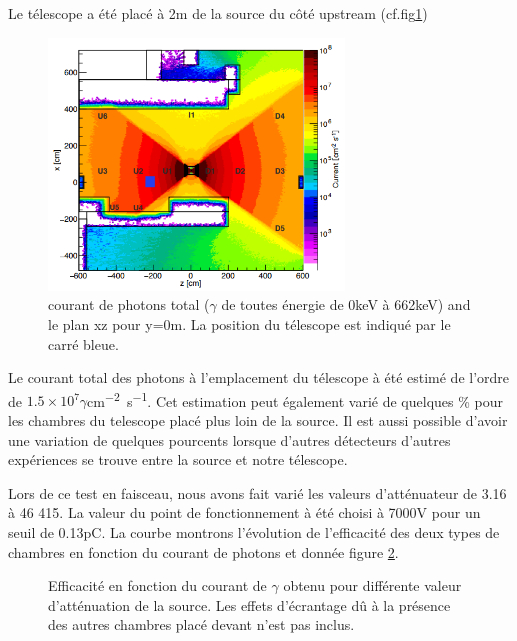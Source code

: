 Le télescope a été placé à 2m de la source du côté upstream (cf.fig\ref{PositionChambre})
\begin{figure}[!ht]
	\centering
	\includegraphics[width=0.7\textwidth]{GLA/PositionChamber.png}
	\caption{courant de photons total ($\gamma$ de toutes énergie de 0keV à 662keV) and le plan xz pour y=0m. La position du télescope est indiqué par le carré bleue.}
	\label{PositionChambre}
\end{figure}

Le courant total des photons à l'emplacement du télescope à été estimé de l'ordre de $1.5\times10^{7}\gamma$\si{cm^{-2}.s^{-1}}. Cet estimation peut également varié de quelques \% pour les chambres du telescope placé plus loin de la source. Il est aussi possible d'avoir une variation de quelques pourcents lorsque d'autres détecteurs d'autres expériences se trouve entre la source et notre télescope.

Lors de ce test en faisceau, nous avons fait varié les valeurs d'atténuateur de 3.16 à 46 415. La valeur du point de fonctionnement à été choisi à 7000V pour un seuil de 0.13pC. La courbe montrons l'évolution de l'efficacité des deux types de chambres en fonction du courant de photons et donnée figure \ref{ATTENUATEURGIF}.

\begin{figure}[!ht]
	\centering
	\scalebox{1.4}{}
	\caption{Efficacité en fonction du courant de $\gamma$ obtenu pour différente valeur d'atténuation de la source. Les effets d'écrantage dû à la présence des autres chambres placé devant n'est pas inclus.}
	\label{ATTENUATEURGIF}
\end{figure}

